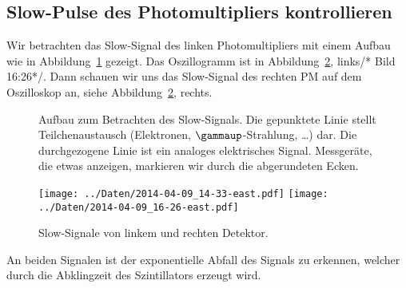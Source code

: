 \subsection{Slow-Pulse des Photomultipliers kontrollieren}

Wir betrachten das Slow-Signal des linken Photomultipliers mit einem Aufbau
wie in Abbildung~\ref{fig:aufbau:slow} gezeigt. Das Oszillogramm ist in
Abbildung~\ref{fig:slow_signal}, links/* Bild 16:26*/. Dann schauen wir uns
das Slow-Signal des rechten PM auf dem Oszilloskop an, siehe
Abbildung~\ref{fig:slow_signal}, rechts.

\begin{figure}[htbp]
    \centering
    \caption{%
        Aufbau zum Betrachten des Slow-Signals. Die gepunktete Linie stellt
        Teilchenaustausch (Elektronen, $\gammaup$-Strahlung, …) dar. Die
        durchgezogene Linie ist ein analoges elektrisches Signal. Messgeräte,
        die etwas anzeigen, markieren wir durch die abgerundeten Ecken.
    }
    \label{fig:aufbau:slow}
\end{figure}

\begin{figure}[htbp]
    \centering
    \texttt{[image: ../Daten/2014-04-09\_14-33-east.pdf]}
    \hfill
    \texttt{[image: ../Daten/2014-04-09\_16-26-east.pdf]}
    \caption{%
        Slow-Signale von linkem und rechten Detektor.
    }
    \label{fig:slow_signal}
\end{figure}

An beiden Signalen ist der exponentielle Abfall des Signals zu erkennen,
welcher durch die Abklingzeit des Szintillators erzeugt wird.

